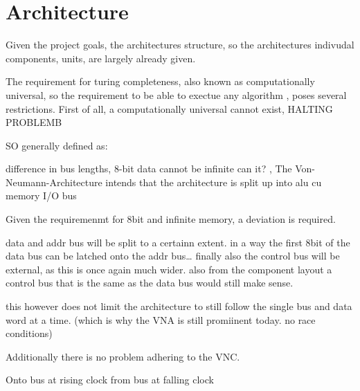 \section{Architecture}

Given the project goals, the architectures structure, so the architectures indivudal components, units, are largely already given. 

  The requirement for turing completeness, also known as computationally universal, so the requirement to be able to exectue any algorithm \cite{cit.needed}, poses several restrictions. First of all, a computationally universal cannot exist, HALTING PROBLEMB

  SO generally defined as:
  
  \cite{cit.needed}


difference in bus lengths, 8-bit data cannot be infinite can it?
,
The Von-Neumann-Architecture \cite{vonneuman1945a} intends that the architecture is split up into 
alu
cu 
memory 
I/O
bus 

Given the requiremenmt for 8bit and infinite memory, a deviation is required. 

data and addr bus will be split to a certainn extent. in a way the first 8bit of the data bus can be latched onto the addr bus\dots
finally also the control bus will be external, as this is once again much wider. also from the component layout a control bus that is the same as the data bus would still make sense. 

this however does not limit the architecture to still follow the single bus and data word at a time. (which is why the VNA is still promiinent today. no race conditions)

Additionally there is no problem adhering to the VNC. 


Onto bus at rising clock
from bus at falling clock













